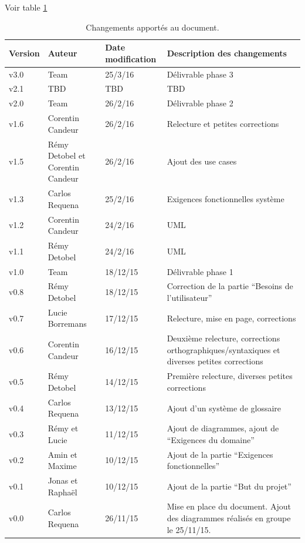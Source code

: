 \documentclass[11pt,a4paper]{article}
\begin{document}
Voir table \ref{tab:hist}


\begin{table}[h]
  \centering
  \begin{tabular}[ht]{|l|l|l|p{15em}|}
    \hline
    \textbf{Version}
    & \textbf{Auteur}
    & \textbf{Date modification}
    & \textbf{Description des changements}\\ \hline \hline
    v3.0 & Team & 25/3/16 & Délivrable phase 3 \\ \hline
    v2.1 & TBD  & TBD     &  TBD  \\ \hline
    v2.0 & Team & 26/2/16 & Délivrable phase 2\\ \hline
    v1.6 & Corentin Candeur & 26/2/16 & Relecture et petites corrections \\ \hline
    v1.5 & Rémy Detobel et Corentin Candeur & 26/2/16 & Ajout des use cases\\ \hline
    v1.3 & Carlos Requena & 25/2/16 & Exigences fonctionnelles système
    \\ \hline
    v1.2 & Corentin Candeur & 24/2/16 & UML \\ \hline
    v1.1 & Rémy Detobel & 24/2/16 & UML \\ \hline
    v1.0 & Team & 18/12/15 & Délivrable phase 1 \\ \hline
    v0.8 & Rémy Detobel & 18/12/15 & Correction de la partie ``Besoins de l'utilisateur'' \\ \hline
    v0.7 & Lucie Borremans & 17/12/15 & Relecture, mise en page, corrections \\ \hline
     v0.6 & Corentin Candeur & 16/12/15 & Deuxième relecture, corrections orthographiques/syntaxiques et diverses petites corrections \\ \hline
    v0.5 & Rémy Detobel & 14/12/15 & Première relecture, diverses petites corrections \\ \hline
    v0.4 & Carlos Requena  & 13/12/15 & Ajout d'un système de glossaire \\ \hline
    v0.3 & Rémy et Lucie  & 11/12/15 & Ajout de diagrammes, ajout de ``Exigences du domaine'' \\ \hline
    v0.2 & Amin et Maxime & 10/12/15 & Ajout de la partie ``Exigences fonctionnelles''\\ \hline
    v0.1 & Jonas et Raphaël & 10/12/15 & Ajout de la partie ``But du projet''\\ \hline
    v0.0 & Carlos Requena & 26/11/15 & Mise en place du document. Ajout des diagrammes réalisés en groupe le 25/11/15.\\ \hline
  \end{tabular}
  \caption{Changements apportés au document.}
  \label{tab:hist}
\end{table}
\end{document}

